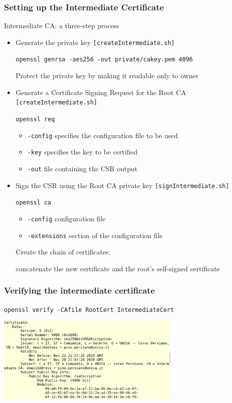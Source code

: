 \documentclass[]{beamer}
\begin{document}
\begin{frame}
\frametitle{Setting up the Intermediate Certificate}
\begin{block}{Intermediate CA: a three-step process}
\begin{itemize}
\item Generate the private key {\tt [createIntermediate.sh]}

    {\color{brown} \tt openssl genrsa -aes256 -out private/cakey.pem 4096}

    {\color{red} Protect the private key by making it readable only to owner}

\item Generate a Certificate Signing Request for the Root CA
{\tt [createIntermediate.sh]}

    {\color{brown} \tt openssl req}

    \begin{itemize}
        \item {\tt -config} specifies the configuration file to be used
        \item {\tt -key} specifies the key to be certified
        \item {\tt -out} file containing the CSR output
    \end{itemize}

\item Sign the CSR using the Root CA private key 
{\tt [signIntermediate.sh]}

    {\color{brown} \tt openssl ca}
    \begin{itemize}
        \item {\tt -config} configuration file 
        \item {\tt -extensions} section of the configuration file
    \end{itemize}

    Create the chain of certificates:

        concatenate the new certificate and the root's 
            self-signed certificate


\end{itemize}

\end{block}
\end{frame}

\begin{frame}
\frametitle{Verifying the intermediate certificate}

\centerline{\color{magenta} \tt openssl verify -CAfile RootCert IntermediateCert}

\begin{center}
\includegraphics[width=3.5in]{imgs/intermediateCert.png}
\end{center}
\end{frame}
\end{document}

